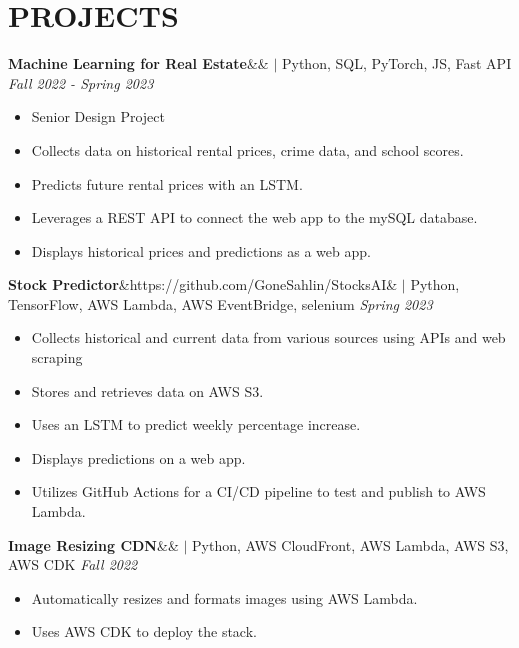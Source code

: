\documentclass[11pt, a4paper, roman]{moderncv}
\newcommand{\project}[5]{
	\textbf{#1}\ifx&#2&{}
	\else
    		\href{#2}{\:\small\faGithub\:}\fi$|$ #3
	\hfill\textit{#4}
	#5
	\vspace{2mm}
}
\begin{document}
\vspace*{-2mm}
\section{PROJECTS}

{\project{Machine Learning for Real Estate}{}{Python, SQL, PyTorch, JS, Fast API}{Fall 2022 - Spring 2023}
	{\begin{itemize}
		\item Senior Design Project
		\item Collects data on historical rental prices, crime data, and school scores.
		\item Predicts future rental prices with an LSTM.
		\item Leverages a REST API to connect the web app to the mySQL database.
		\item Displays historical prices and predictions as a web app.
	\end{itemize}}
}

{\project{Stock Predictor}{https://github.com/GoneSahlin/StocksAI}{Python, TensorFlow, AWS Lambda, AWS EventBridge, selenium}{Spring 2023}
	{\begin{itemize}
		\item Collects historical and current data from various sources using APIs and web scraping
		\item Stores and retrieves data on AWS S3.
		\item Uses an LSTM to predict weekly percentage increase.
		\item Displays predictions on a web app.
		\item Utilizes GitHub Actions for a CI/CD pipeline to test and publish to AWS Lambda.
	\end{itemize}}
}		

{\project{Image Resizing CDN}{}{Python, AWS CloudFront, AWS Lambda, AWS S3, AWS CDK}{Fall 2022}
	{\begin{itemize}
		\item Automatically resizes and formats images using AWS Lambda.
		\item Uses AWS CDK to deploy the stack.
	\end{itemize}}
}

\end{document}
